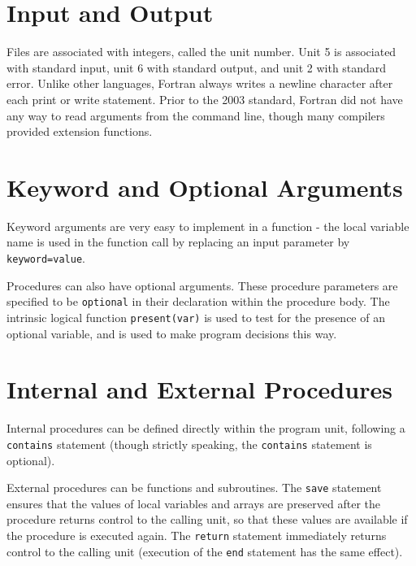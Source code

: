\documentclass[10pt]{article}
\begin{document}
\section{Input and Output}
Files are associated with integers, called the unit number. Unit 5 is associated with standard input, unit 6 with standard output, and unit 2 with standard error. Unlike other languages, Fortran always writes a newline character after each print or write statement.  Prior to the 2003 standard, Fortran did not have any way to read arguments from the command line, though many compilers provided extension functions. 

\section{Keyword and Optional Arguments}
Keyword arguments are very easy to implement in a function - the local variable name is used in the function call by replacing an input parameter by {\tt keyword=value}. 

Procedures can also have optional arguments. These procedure parameters are specified to be {\tt optional} in their declaration within the procedure body. The intrinsic logical function {\tt present(var)} is used to test for the presence of an optional variable, and is used to make program decisions this way.

\section{Internal and External Procedures}

Internal procedures can be defined directly within the program unit, following a {\tt contains} statement (though strictly speaking, the {\tt contains} statement is optional). 

External procedures can be functions and subroutines. The {\tt save} statement ensures that the values of local variables and arrays are preserved after the procedure returns control to the calling unit, so that these values are available if the procedure is executed again. The {\tt return} statement immediately returns control to the calling unit (execution of the {\tt end} statement has the same effect). 
\end{document}
